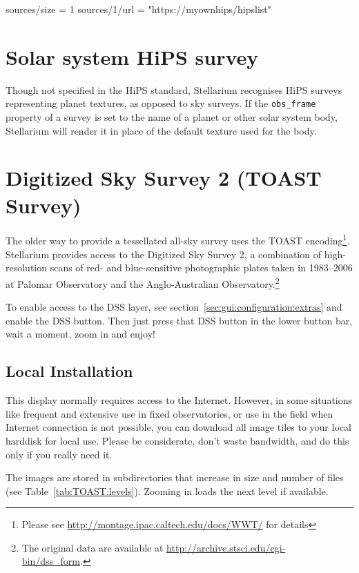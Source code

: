 \begin{configfile}
[hips]
sources/size = 1
sources/1/url = "https://myownhips/hipslist"

\end{configfile}

\section{Solar system HiPS survey}

Though not specified in the HiPS standard, Stellarium recognises HiPS surveys
representing planet textures, as opposed to sky surveys.  If the
\texttt{obs\_frame} property of a survey is set to the name of a planet or
other solar system body, Stellarium will render it in place of the default
texture used for the body.


\section{Digitized Sky Survey 2 (TOAST Survey)}
\label{sec:TOAST}

The older way to provide a tessellated all-sky survey uses the TOAST
encoding\footnote{Please see
  \url{http://montage.ipac.caltech.edu/docs/WWT/} for details}.
Stellarium provides access to the Digitized Sky Survey 2, a
combination of high-resolution scans of red- and blue-sensitive
photographic plates taken in 1983--2006 at Palomar Observatory and the
Anglo-Australian Observatory.\footnote{The original data are available
  at \url{http://archive.stsci.edu/cgi-bin/dss_form}.}

To enable access to the DSS layer, see
section~\ref{sec:gui:configuration:extras} and enable the DSS
button. Then just press that DSS button in the lower button bar, wait
a moment, zoom in and enjoy!

\subsection{Local Installation}

This display normally requires access to the Internet. However, in
some situations like frequent and extensive use in fixed observatories,
or use in the field when Internet connection is not possible, you can
download all image tiles to your local harddisk for local use. Please be
considerate, don't waste bandwidth, and do this only if you really need it.

The images are stored in subdirectories that increase in size and
number of files (see Table~\ref{tab:TOAST:levels}). Zooming in loads
the next level if available.

